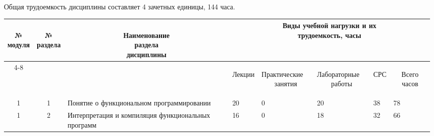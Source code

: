 Общая трудоемкость дисциплины составляет 4 зачетных единицы, 144 часа.

\begin{center}
\begin{longtable}{|c|c|p{}|p{1.4cm}|p{1.4cm}|p{1.4cm}|p{1.4cm}|p{1.4cm}|}\hline
\multicolumn{1}{|c|}{\multirow{2}{*}{\parbox[c]{1.6cm}{\bfseries~\\№\\модуля}}} &
\multicolumn{1}{c|}{\multirow{2}{*}{\parbox[c]{1.6cm}{\bfseries~\\№\\раздела}}} &
\multicolumn{1}{c|}{\multirow{2}{*}{\parbox[c]{0.2\textwidth}{\bfseries~\\Наименование\\раздела\\дисциплины}}} &
\multicolumn{5}{c|}{\parbox[c]{0.4\textwidth}{\bfseries{}Виды учебной нагрузки и их\\ трудоемкость, часы}}\\\cline{4-8}
& & &
\multicolumn{1}{c|}{\bfseries\begin{sideways}Лекции\end{sideways}} &
\multicolumn{1}{c|}{\bfseries\begin{sideways}\parbox[c]{0.25\textwidth}{Практические~~\\занятия}\end{sideways}} &
\multicolumn{1}{c|}{\bfseries\begin{sideways}\parbox[c]{1.4cm}{Лабораторные~~\\работы}\end{sideways}} &
\multicolumn{1}{c|}{\bfseries\begin{sideways}СРС\end{sideways}} &
\multicolumn{1}{c|}{\bfseries\begin{sideways}Всего часов\end{sideways}}\\\hline
1 & 1 & Понятие о функциональном программировании & 20 & 0 & 20 & 38 & 78\\\hline
1 & 2 & Интерпретация и компиляция функциональных программ & 16 & 0 & 18 & 32 & 66\\\hline

\end{longtable}
\end{center}



